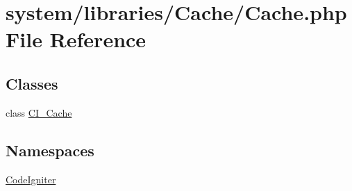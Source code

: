 \hypertarget{_cache_8php}{}\section{system/libraries/\+Cache/\+Cache.php File Reference}
\label{_cache_8php}
\subsection*{Classes}
\begin{DoxyCompactItemize}
\item 
class \mbox{\hyperlink{class_c_i___cache}{C\+I\+\_\+\+Cache}}
\end{DoxyCompactItemize}
\subsection*{Namespaces}
\begin{DoxyCompactItemize}
\item 
 \mbox{\hyperlink{namespace_code_igniter}{Code\+Igniter}}
\end{DoxyCompactItemize}
